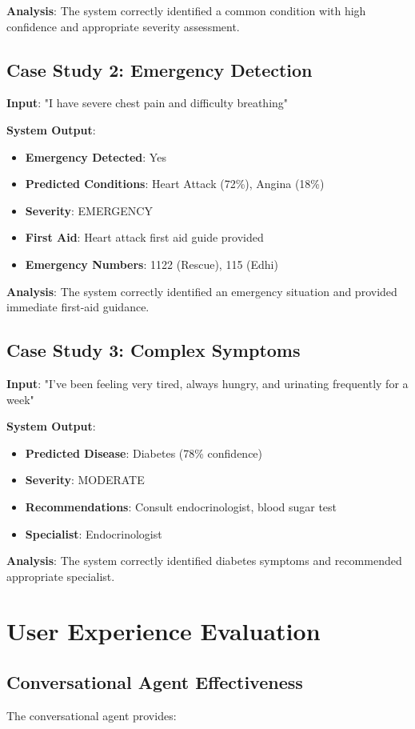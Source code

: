 \textbf{Analysis}: The system correctly identified a common condition with high confidence and appropriate severity assessment.

\subsection{Case Study 2: Emergency Detection}
\textbf{Input}: "I have severe chest pain and difficulty breathing"

\textbf{System Output}:
\begin{itemize}
    \item \textbf{Emergency Detected}: Yes
    \item \textbf{Predicted Conditions}: Heart Attack (72\%), Angina (18\%)
    \item \textbf{Severity}: EMERGENCY
    \item \textbf{First Aid}: Heart attack first aid guide provided
    \item \textbf{Emergency Numbers}: 1122 (Rescue), 115 (Edhi)
\end{itemize}

\textbf{Analysis}: The system correctly identified an emergency situation and provided immediate first-aid guidance.

\subsection{Case Study 3: Complex Symptoms}
\textbf{Input}: "I've been feeling very tired, always hungry, and urinating frequently for a week"

\textbf{System Output}:
\begin{itemize}
    \item \textbf{Predicted Disease}: Diabetes (78\% confidence)
    \item \textbf{Severity}: MODERATE
    \item \textbf{Recommendations}: Consult endocrinologist, blood sugar test
    \item \textbf{Specialist}: Endocrinologist
\end{itemize}

\textbf{Analysis}: The system correctly identified diabetes symptoms and recommended appropriate specialist.

\section{User Experience Evaluation}
\subsection{Conversational Agent Effectiveness}
The conversational agent provides:

